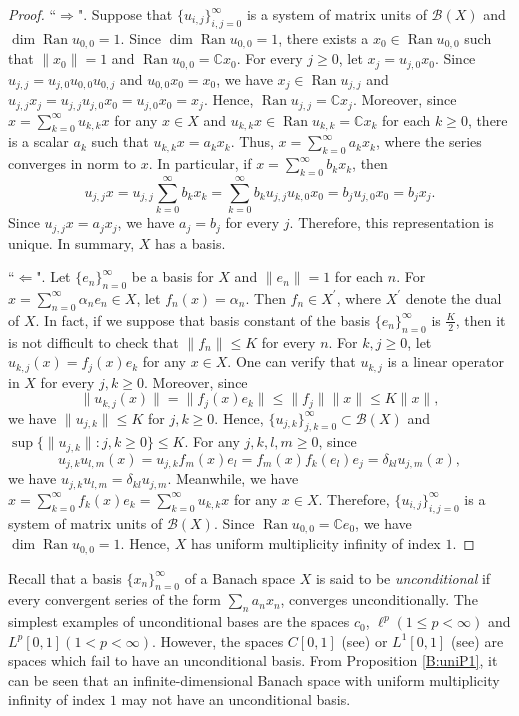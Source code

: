 \documentclass[12pt]{amsart}
\numberwithin{equation}{section}
\theoremstyle{plain}
\theoremstyle{definition}
\newcommand{\B}{{\mathcal{B}}}
\newcommand{\ran}{\operatorname{Ran}}
\begin{document}
\begin{proof}
``$\Rightarrow$".
Suppose that $\{u_{i,j}\}_{i,j=0}^{\infty}$ is a system of matrix units of $\B(X)$ and $\dim \ran u_{0,0}=1$.
Since $\dim \ran u_{0,0}=1$, there exists a $x_0\in\ran u_{0,0}$ such that $\|x_0\|=1$ and $\ran u_{0,0}=\mathbb{C}x_0$.
For every $j\geq 0$, let $x_j=u_{j,0}x_0$.
Since $u_{j,j}=u_{j,0}u_{0,0}u_{0,j}$ and $u_{0,0}x_0=x_0$, we have
$x_j\in \ran u_{j,j}$ and
$u_{j,j} x_j=u_{j,j}u_{j,0}x_0=u_{j,0}x_0=x_j$.
Hence, $\ran u_{j,j}=\mathbb{C}x_j$.
Moreover,
since $x=\sum_{k=0}^{\infty} u_{k,k}x$ for any $x\in X$ and
$u_{k,k}x\in\ran u_{k,k}=\mathbb{C}x_k$ for each $k\geq 0$,
there is a scalar $a_k$ such that $u_{k,k}x=a_kx_k$.
Thus, $x=\sum_{k=0}^{\infty}a_kx_k$, where the series converges in norm to $x$.
In particular, if $x=\sum_{k=0}^{\infty}b_kx_k$, then
$$u_{j,j}x=u_{j,j}\sum\limits_{k=0}^{\infty}b_kx_k=\sum\limits_{k=0}^{\infty}b_k u_{j,j}u_{k,0}x_0=b_j u_{j,0}x_0=b_jx_j.$$
Since $u_{j,j}x=a_jx_j$, we have $a_j=b_j$ for every $j$.
Therefore, this representation is unique.
In summary, $X$ has a basis.

``$\Leftarrow$".
Let $\{e_n\}_{n=0}^{\infty}$ be a basis for $X$ and $\|e_n\|=1$ for each
$n$.
For $x=\sum_{n=0}^{\infty}\alpha_n e_n\in X$,
let $f_n(x)=\alpha_{n}$. Then $f_n\in X^\prime$, where $X^\prime$ denote the dual of $X$.
In fact,
if we suppose that basis constant of the basis $\{e_n\}_{n=0}^{\infty}$ is $\frac{K}{2}$, then it is not difficult to check that $\|f_n\|\leq K$ for every $n$.
For $k,j\geq 0$, let $u_{k,j}(x)=f_j(x)e_k$ for any $x\in X$.
One can verify that $u_{k,j}$ is a linear operator in $X$ for every $j,k\geq 0$.
Moreover,
since
$$\|u_{k,j}(x)\|=\|f_j(x)e_k\|\leq \|f_j\|\|x\|\leq K \|x\|,$$
we have $\|u_{j,k}\|\leq K$ for $j,k\geq 0$.
Hence, $\{u_{j,k}\}_{j,k=0}^{\infty}\subset \B(X)$ and $\sup\{\|u_{j,k}\|:j,k\geq 0\}\leq K$.
For any $j,k,l,m\geq 0$, since
$$u_{j,k}u_{l,m}(x)=u_{j,k}f_m(x)e_l=f_m(x)f_k(e_l)e_j
=\delta_{kl} u_{j,m}(x),$$
we have $u_{j,k}u_{l,m}=\delta_{kl} u_{j,m}$.
Meanwhile,
we have
$x=\sum_{k=0}^{\infty}f_k(x)e_k=\sum_{k=0}^{\infty} u_{k,k}x$ for any $x\in X$.
Therefore, $\{u_{i,j}\}_{i,j=0}^{\infty}$ is a system of matrix units of $\B(X)$.
Since $\ran u_{0,0}=\mathbb{C} e_0$, we have $\dim\ran u_{0,0}=1$.
Hence, $X$ has uniform multiplicity infinity of index $1$.
\end{proof}

Recall that
a basis $\{x_n\}_{n=0}^{\infty}$ of a Banach space $X$ is said to be \emph{unconditional} if every convergent series of the form $\sum_n a_nx_n$,
converges unconditionally.
The simplest examples of unconditional bases are the spaces
$c_0$, $\ell^p(1\leq p<\infty)$ and $L^p[0,1](1<p<\infty)$.
However,
the spaces $C[0,1]$ (see\cite{Karlin1948}) or
$L^1[0,1]$ (see\cite{Pelczynski1961}) are spaces which fail to have an unconditional basis.
From Proposition \ref{B:uniP1}, it can be seen that an infinite-dimensional Banach space with uniform multiplicity infinity of index $1$ may not have an unconditional basis.
\end{document}

